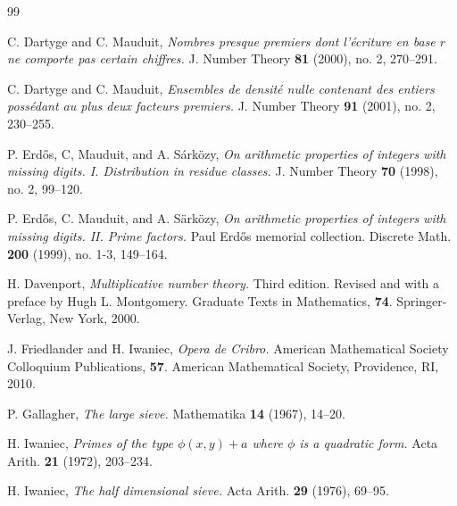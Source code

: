 \documentclass[12pt]{amsart}
\numberwithin{equation}{section}
\theoremstyle{remark}
\theoremstyle{definition}
\begin{document}
 






















\begin{thebibliography}{99}

 C. Dartyge and C. Mauduit, \emph{Nombres presque premiers dont l'\'ecriture en base $r$ ne comporte pas certain chiffres.} J. Number Theory \textbf{81} (2000), no. 2,  270--291.

 C. Dartyge and C. Mauduit, \emph{Ensembles de densit\'e nulle contenant des entiers poss\'edant au plus deux facteurs premiers.} J. Number Theory \textbf{91} (2001), no. 2, 230--255.


 P. Erd\H{o}s, C, Mauduit, and A. S\'ark\"ozy, \emph{On arithmetic properties of integers with missing digits. I. Distribution in residue classes.} J. Number Theory \textbf{70} (1998), no. 2, 99--120.

 P. Erd\H{o}s, C. Mauduit, and A. S\"ark\"ozy, \emph{On arithmetic properties of integers with missing digits. II. Prime factors.} Paul Erd\H{o}s memorial collection. Discrete Math. \textbf{200} (1999), no. 1-3, 149--164. 

 H. Davenport, \emph{Multiplicative number theory.} Third edition. Revised and with a preface by Hugh L. Montgomery. Graduate Texts in Mathematics, \textbf{74}. Springer-Verlag, New York, 2000.

 J. Friedlander and H. Iwaniec, \emph{Opera de Cribro.} American Mathematical Society Colloquium Publications, \textbf{57}. American Mathematical Society, Providence, RI, 2010.

 P. Gallagher, \emph{The large sieve.} Mathematika \textbf{14} (1967), 14--20.
 
  H. Iwaniec, \emph{Primes of the type $\phi(x, y) +a$ where $\phi$ is a quadratic form.} Acta Arith. \textbf{21} (1972), 203--234.
 
  H. Iwaniec, \emph{The half dimensional sieve.} Acta Arith. \textbf{29} (1976), 69--95.
 

\end{thebibliography}
\end{document}
